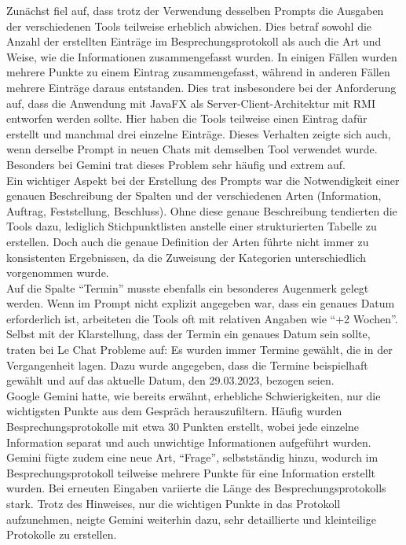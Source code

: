 Zunächst fiel auf, dass trotz der Verwendung desselben Prompts die Ausgaben der verschiedenen Tools teilweise erheblich abwichen. 
Dies betraf sowohl die Anzahl der erstellten Einträge im Besprechungsprotokoll als auch die Art und Weise, wie die Informationen 
zusammengefasst wurden. In einigen Fällen wurden mehrere Punkte zu einem Eintrag zusammengefasst, während in anderen Fällen mehrere 
Einträge daraus entstanden. Dies trat insbesondere bei der Anforderung auf, dass die Anwendung mit JavaFX als Server-Client-Architektur 
mit RMI entworfen werden sollte. Hier haben die Tools teilweise einen Eintrag dafür erstellt und manchmal drei einzelne Einträge. 
Dieses Verhalten zeigte sich auch, wenn derselbe Prompt in neuen Chats mit demselben Tool verwendet wurde. Besonders bei Gemini trat 
dieses Problem sehr häufig und extrem auf.\\

Ein wichtiger Aspekt bei der Erstellung des Prompts war die Notwendigkeit einer genauen Beschreibung der Spalten und der verschiedenen 
Arten (Information, Auftrag, Feststellung, Beschluss). Ohne diese genaue Beschreibung tendierten die Tools dazu, lediglich 
Stichpunktlisten anstelle einer strukturierten Tabelle zu erstellen. Doch auch die genaue Definition der Arten führte nicht immer zu 
konsistenten Ergebnissen, da die Zuweisung der Kategorien unterschiedlich vorgenommen wurde.\\

Auf die Spalte ``Termin'' musste ebenfalls ein besonderes Augenmerk gelegt werden. Wenn im Prompt nicht explizit angegeben war, dass ein 
genaues Datum erforderlich ist, arbeiteten die Tools oft mit relativen Angaben wie ``+2 Wochen''. Selbst mit der Klarstellung, dass der 
Termin ein genaues Datum sein sollte, traten bei Le Chat Probleme auf: Es wurden immer Termine gewählt, die in der Vergangenheit lagen. 
Dazu wurde angegeben, dass die Termine beispielhaft gewählt und auf das aktuelle Datum, den 29.03.2023, bezogen seien.\\

Google Gemini hatte, wie bereits erwähnt, erhebliche Schwierigkeiten, nur die wichtigsten Punkte aus dem Gespräch herauszufiltern. 
Häufig wurden Besprechungsprotokolle mit etwa 30 Punkten erstellt, wobei jede einzelne Information separat und auch unwichtige 
Informationen aufgeführt wurden. Gemini fügte zudem eine neue Art, ``Frage'', selbstständig hinzu, wodurch im Besprechungsprotokoll 
teilweise mehrere Punkte für eine Information erstellt wurden. Bei erneuten Eingaben variierte die Länge des Besprechungsprotokolls 
stark. Trotz des Hinweises, nur die wichtigen Punkte in das Protokoll aufzunehmen, neigte Gemini weiterhin dazu, sehr detaillierte und 
kleinteilige Protokolle zu erstellen.\\


